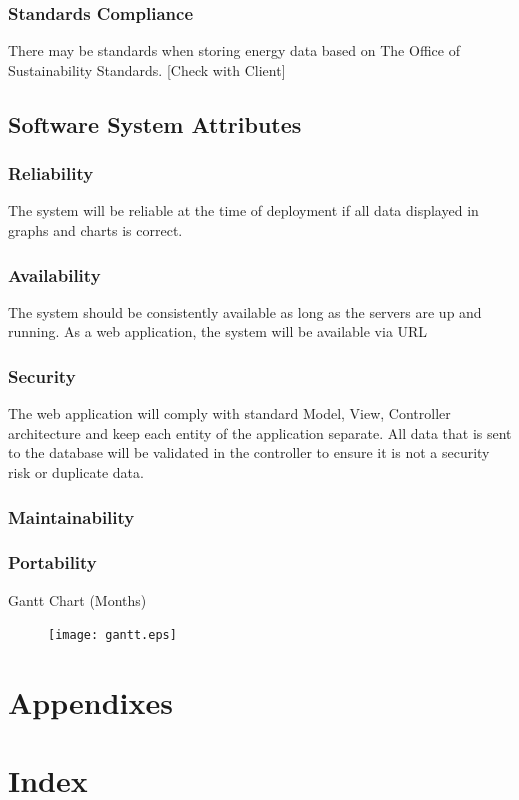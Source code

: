 \documentclass[onecolumn, draftclsnofoot,10pt, compsoc]{IEEEtran}
\begin{document}
    \subsubsection{Standards Compliance}
    There may be standards when storing energy data based on The Office of Sustainability Standards.
    [Check with Client]

    \subsection{Software System Attributes}
    
    \subsubsection{Reliability}
    The system will be reliable at the time of deployment if all data displayed in graphs and charts is correct.\\
    \subsubsection{Availability}
    The system should be consistently available as long as the servers are up and running. As a web application, the system will be available via URL 
    \subsubsection{Security}
    The web application will comply with standard Model, View, Controller architecture and keep each entity of the application separate. All data that is sent to the database will be validated in the controller to ensure it is not a security risk or duplicate data.\\
    \subsubsection{Maintainability}
    
    \subsubsection{Portability}

    Gantt Chart (Months)\\ 
    \begin{figure}[H]
        \centering
        \texttt{[image: gantt.eps]}
    \end{figure}

    \section{Appendixes}
    \section{Index}
    
    
\end{document}
